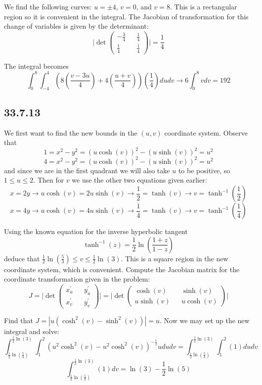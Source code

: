 \documentclass{article}
\begin{document}
We find the following curves:
$u=\pm 4$, $v=0$, and $v=8$. This is a rectangular region so it is convenient in the integral. The Jacobian of transformation for this change of variables is given by the determinant: $$\bigg| \det \begin{pmatrix}
    -\frac{3}{4} && \frac{1}{4} \\
    \frac{1}{4} && \frac{1}{4}
\end{pmatrix}\bigg| = \frac{1}{4}$$

The integral becomes $$\int_{0}^{8}\int_{-4}^{4} \left(8\left(\frac{v-3u}{4}\right) + 4\left(\frac{u+v}{4}\right)\right)\left(\frac{1}{4}\right)dudv \to 6\int_0^8 v dv = 192$$

\subsection{33.7.13}

We first want to find the new bounds in the $(u,v)$ coordinate system. Observe that $$1 = x^2-y^2 = (u\cosh(v))^2-(u\sinh(v))^2 = u^2$$
$$4 = x^2-y^2 = (u\cosh(v))^2-(u\sinh(v))^2 = u^2$$ and since we are in the first quadrant we will also take $u$ to be positive, so $1\leq u \leq 2$. Then for $v$ we use the other two equations given earlier: $$x = 2y \to u\cosh(v) = 2u\sinh(v) \to \frac{1}{2} = \tanh(v) \to v = \tanh^{-1}\left(\frac{1}{2}\right)$$
$$x = 4y \to u\cosh(v) = 4u\sinh(v) \to \frac{1}{4} = \tanh(v) \to v = \tanh^{-1}\left(\frac{1}{4}\right)$$

Using the known equation for the inverse hyperbolic tangent $$\tanh^{-1}(z) = \frac{1}{2}\ln\left(\frac{1+z}{1-z}\right)$$ deduce that $\frac{1}{2}\ln\left(\frac{5}{3}\right)\leq v \leq \frac{1}{2}\ln(3)$. This is a square region in the new coordinate system, which is convenient. Compute the Jacobian matrix for the coordinate transformation given in the problem:
$$J = \bigg|\det \begin{pmatrix}
    x^{\prime}_u && y^{\prime}_u \\
    x^{\prime}_v && y^{\prime}_v
\end{pmatrix}\bigg| = \bigg|\det \begin{pmatrix}
    \cosh(v) && \sinh(v) \\
    u\sinh(v) && u\cosh(v)
\end{pmatrix}\bigg|$$

Find that $J = |u(\cosh^2(v) - \sinh^2(v))| = u$. Now we may set up the new integral and solve:
$$\int_{\frac{1}{2}\ln\left(\frac{5}{3}\right)}^{\frac{1}{2}\ln(3)}\int_{1}^{2} (u^2\cosh^2(v) - u^2\cosh^2(v))^{-\frac{1}{2}} ududv = \int_{\frac{1}{2}\ln\left(\frac{5}{3}\right)}^{\frac{1}{2}\ln(3)}\int_{1}^{2} (1) dudv$$
$$\int_{\frac{1}{2}\ln\left(\frac{5}{3}\right)}^{\frac{1}{2}\ln(3)} (1) dv = \ln(3) - \frac{1}{2}\ln(5)$$
\end{document}
